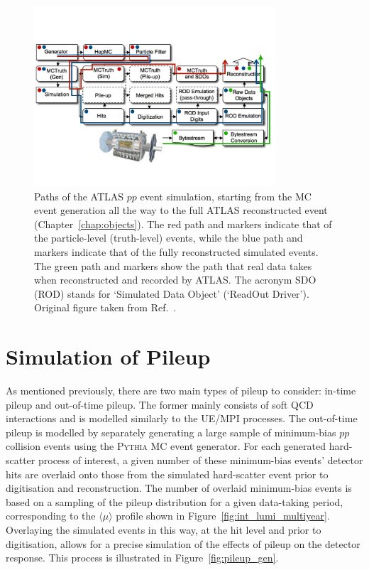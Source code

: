 \begin{figure}[!htb]
    \begin{center}
        \includegraphics[width=0.8\textwidth]{figures/event_simulation/atlas_sim_structure_arrPDF}
        \caption{
            Paths of the ATLAS $pp$ event simulation, starting from the MC event generation all the way
            to the full ATLAS reconstructed event (Chapter~\ref{chap:objects}).
            The red path and markers indicate that of the particle-level (truth-level) events,
            while the blue path and markers indicate that of the fully reconstructed simulated events.
            The green path and markers show the path that real data takes when reconstructed and recorded by ATLAS.
            The acronym SDO (ROD) stands for `Simulated Data Object' (`ReadOut Driver').
            Original figure taken from Ref.~\cite{ATLASSim}.
        }
        \label{fig:atlas_sim_structure}
    \end{center}
\end{figure}

\section{Simulation of Pileup}
\label{sec:pileup_sim}

As mentioned previously, there are two main types of pileup to consider: in-time pileup and out-of-time pileup.
The former mainly consists of soft QCD interactions and is modelled similarly to the UE/MPI processes.
The out-of-time pileup is modelled by separately generating a large sample of minimum-bias $pp$ collision events
using the \textsc{Pythia} MC event generator.
For each generated hard-scatter process of interest, a given number of these minimum-bias events' detector hits
are overlaid onto those from the simulated hard-scatter event prior to digitisation and reconstruction.
The number of overlaid minimum-bias events is based on a sampling of the pileup distribution for a given
data-taking period, corresponding to the $\langle \mu \rangle$ profile shown in Figure~\ref{fig:int_lumi_multiyear}.
Overlaying the simulated events in this way, at the hit level and prior to digitisation, allows for a precise
simulation of the effects of pileup on the detector response.
This process is illustrated in Figure~\ref{fig:pileup_gen}.

